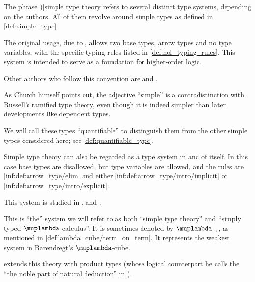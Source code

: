 \begin{concept}\label{con:simple_type_theory}
  The phrase \term[en=simple type theory (\cite[ix]{Hindley1997BasicSTT})]{simple type theory} refers to several distinct \hyperref[def:abstract_type_system]{type systems}, depending on the authors. All of them revolve around simple types as defined in \cref{def:simple_type}.

  \begin{thmenum}
     The original usage, due to \cite[56]{Church1940STT}, allows two base types, arrow types and no type variables, with the specific typing rules listed in \cref{def:hol_typing_rules}. This system is intended to serve as a foundation for \hyperref[def:higher_order_logic]{higher-order logic}.

    Other authors who follow this convention are \textcite[\S 51]{Andrews2002Logic} and \textcite[269]{Farmer2008STTVirtues}.

    As Church himself points out, the adjective \enquote{simple} is a contradistinction with Russell's \hyperref[def:ramified_theory_of_types]{ramified type theory}, even though it is indeed simpler than later developments like \hyperref[con:dependent_type]{dependent types}.

    We will call these types \enquote{quantifiable} to distinguish them from the other simple types considered here; see \cref{def:quantifiable_type}.

     Simple type theory can also be regarded as a type system in and of itself. In this case base types are disallowed, but type variables are allowed, and the rules are \ref{inf:def:arrow_type/elim} and either \ref{inf:def:arrow_type/intro/implicit} or \ref{inf:def:arrow_type/intro/explicit}.

    This system is studied in \cite[def. 3.2.2]{Barendregt1992LambdaCalculiWithTypes}, \textcite{Hindley1997BasicSTT} and \textcite[def. 1.2.1]{TroelstraSchwichtenberg2000BasicProofTheory}.

    This is \enquote{the} system we will refer to as both \enquote{simple type theory} and \enquote{simply typed \( \muplambda \)-calculus}. It is sometimes denoted by \( \muplambda_{\rightarrow} \), as mentioned in \cref{def:lambda_cube/term_on_term}. It represents the weakest system in Barendregt's \hyperref[def:lambda_cube]{\( \muplambda \)-cube}.

    \textcite{GirardEtAl1989ProofsAndTypes} extends this theory with product types (whose logical counterpart he calls the \enquote{the noble part of natural deduction} in \cite[\S 5.3]{GirardEtAl1989ProofsAndTypes}).


\end{thmenum}
\end{concept}
